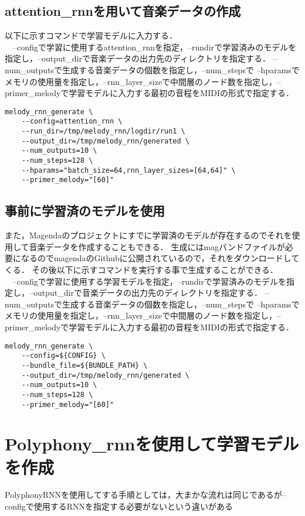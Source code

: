 \subsection{attention\_rnnを用いて音楽データの作成}
以下に示すコマンドで学習モデルに入力する．\\
　--configで学習に使用するattention\_rnnを指定，--rundirで学習済みのモデルを指定し，--output\_dirで音楽データの出力先のディレクトリを指定する．
--num\_outputsで生成する音楽データの個数を指定し，--num\_stepsで
--hparamsでメモリの使用量を指定し，--rnn\_layer\_sizeで中間層のノード数を指定し，--primer\_melodyで学習モデルに入力する最初の音程をMIDIの形式で指定する．\\
\begin{lstlisting}[basicstyle=\ttfamily\footnotesize,frame=single]
    melody_rnn_generate \
    --config=attention_rnn \
    --run_dir=/tmp/melody_rnn/logdir/run1 \
    --output_dir=/tmp/melody_rnn/generated \
    --num_outputs=10 \
    --num_steps=128 \
    --hparams="batch_size=64,rnn_layer_sizes=[64,64]" \
    --primer_melody="[60]"
\end{lstlisting}
\subsection{事前に学習済のモデルを使用}
また，Magendaのプロジェクトにすでに学習済のモデルが存在するのでそれを使用して音楽データを作成することもできる．
生成にはmagバンドファイルが必要になるのでmagendaのGithubに公開されているので，それをダウンロードしてくる．
その後以下に示すコマンドを実行する事で生成することができる．\\
　--configで学習に使用する学習モデルを指定，--rundirで学習済みのモデルを指定し，--output\_dirで音楽データの出力先のディレクトリを指定する．
--num\_outputsで生成する音楽データの個数を指定し，--num\_stepsで
--hparamsでメモリの使用量を指定し，--rnn\_layer\_sizeで中間層のノード数を指定し，--primer\_melodyで学習モデルに入力する最初の音程をMIDIの形式で指定する．\\
\begin{lstlisting}[basicstyle=\ttfamily\footnotesize,frame=single]
    melody_rnn_generate \
    --config=${CONFIG} \
    --bundle_file=${BUNDLE_PATH} \
    --output_dir=/tmp/melody_rnn/generated \
    --num_outputs=10 \
    --num_steps=128 \
    --primer_melody="[60]"
\end{lstlisting}
\newpage
\section{Polyphony\_rnnを使用して学習モデルを作成}
PolyphonyRNNを使用してする手順としては，大まかな流れは同じであるが--configで使用するRNNを指定する必要がないという違いがある
